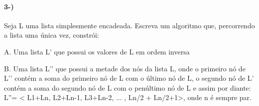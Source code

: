 \documentclass[portuguese,12pt,a4paper]{article}
\begin{document}
\paragraph{3-)}
Seja L uma lista simplesmente encadeada. Escreva um algoritmo que, percorrendo a lista uma única vez, constrói:

A. Uma lista L’ que possui os valores de L em ordem inversa

B. Uma lista L’' que possui a metade dos nós da lista L, onde o primeiro nó de L’' contém a soma do primeiro nó de L com o último nó de L, o segundo nó de L’ contém a soma do segundo nó de L com o penúltimo nó de L e assim por diante: L''= < L1+Ln, L2+Ln-1, L3+Ln-2, ... , Ln/2 + Ln/2+1>, onde n é sempre par.\newline

\lstset{language=C++,
	basicstyle=\footnotesize,
	numbers=left,
	numberstyle=\footnotesize,
	frame=shadowbox}
\end{document}
